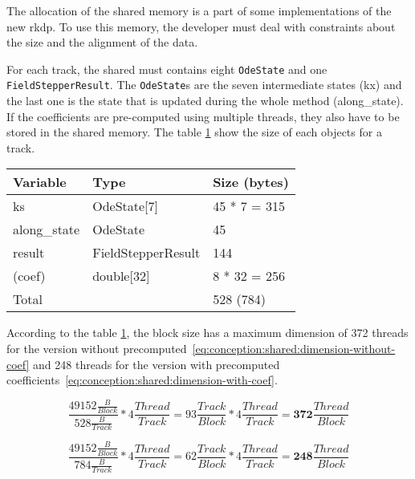 The allocation of the shared memory is a part of some implementations of the
new \acrshort{rkdp}.
To use this memory, the developer must deal with constraints about the size and
the alignment of the data.

For each track, the shared must contains eight \texttt{OdeState} and one
\texttt{FieldStepperResult}. The \texttt{OdeState}s are the seven intermediate
states (kx) and the last one is the state that is updated during the
whole method (along\_state).
If the coefficients are pre-computed using multiple threads, they also have to be
stored in the shared memory.
The table \ref{tab:conception:shared-component} show the size of each objects
for a track.

\begin{table}[ht]
    \centering
    \begin{tabular}{|l|l|l|}
        \hline
        \textbf{Variable} & \textbf{Type} & \textbf{Size (bytes)} \\
        \hline
        ks & OdeState[7] & 45 * 7 = 315 \\
        \hline
        along\_state & OdeState & 45 \\
        \hline
        result & FieldStepperResult & 144 \\
        \hline
        (coef) & double[32] & 8 * 32 = 256 \\
        \hline
        \multicolumn{2}{|l|}{Total} & 528 (784) \\
        \hline
    \end{tabular}
    \label{tab:conception:shared-component}
\end{table}

According to the table \ref{tab:conception:shared-component}, the block size
has a maximum dimension of 372 threads for the version without precomputed~\ref{eq:conception:shared:dimension-without-coef}
and 248 threads for the version with precomputed coefficients~\ref{eq:conception:shared:dimension-with-coef}.

\begin{equation}
    \frac{49152\frac{B}{Block} }{528 \frac{B}{Track} } * 4 \frac{Thread}{Track} = 93\frac{Track}{Block} * 4 \frac{Thread}{Track} = \textbf{372}\frac{Thread}{Block}
    \label{eq:conception:shared:dimension-without-coef}
\end{equation}

\begin{equation}
    \frac{49152\frac{B}{Block} }{784 \frac{B}{Track} } * 4 \frac{Thread}{Track} = 62\frac{Track}{Block} * 4 \frac{Thread}{Track} = \textbf{248}\frac{Thread}{Block}
    \label{eq:conception:shared:dimension-with-coef}
\end{equation}

